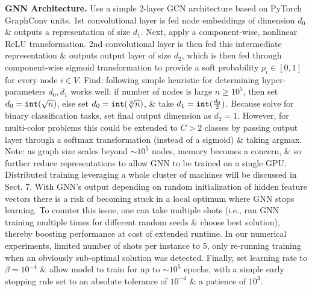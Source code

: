 \documentclass{article}
\begin{document}
\begin{itemize}
    {\bf GNN Architecture.} Use a simple 2-layer GCN architecture based on PyTorch GraphConv units. 1st convolutional layer is fed node embeddings of dimension $d_0$ \& outputs a representation of size $d_1$. Next, apply a component-wise, nonlinear ReLU transformation. 2nd convolutional layer is then fed this intermediate representation \& outputs output layer of size $d_2$, which is then fed through component-wise sigmoid transformation to provide a soft probability $p_i\in[0,1]$ for every node $i\in V$. Find: following simple heuristic for determining hyper-parameters $d_0,d_1$ works well: if number of nodes is large $n\ge10^5$, then set $d_0 = {\tt int}(\sqrt{n})$, else set $d_0 = {\tt int}(\sqrt[3]{n})$, \& take $d_1 = {\tt int}(\frac{d_0}{2})$. Because solve for binary classification tasks, set final output dimension as $d_2 = 1$. However, for multi-color problems this could be extended to $C > 2$ classes by passing output layer through a softmax transformation (instead of a sigmoid) \& taking argmax. Note: as graph size scales beyond $\sim10^5$ nodes, memory becomes a concern, \& so further reduce representations to allow GNN to be trained on a single GPU. Distributed training leveraging a whole cluster of machines will be discussed in Sect. 7. With GNN's output depending on random initialization of hidden feature vectors there is a risk of becoming stuck in a local optimum where GNN stops learning. To counter this issue, one can take multiple shots (i.e., run GNN training multiple times for different random seeds \& choose best solution), thereby boosting performance at cost of extended runtime. In our numerical experiments, limited number of shots per instance to 5, only re-running training when an obviously sub-optimal solution was detected. Finally, set learning rate to $\beta = 10^{-4}$ \& allow model to train for up to $\sim10^5$ epochs, with a simple early stopping rule set to an absolute tolerance of $10^{-4}$ \& a patience of $10^3$.


\end{itemize}
\end{document}
